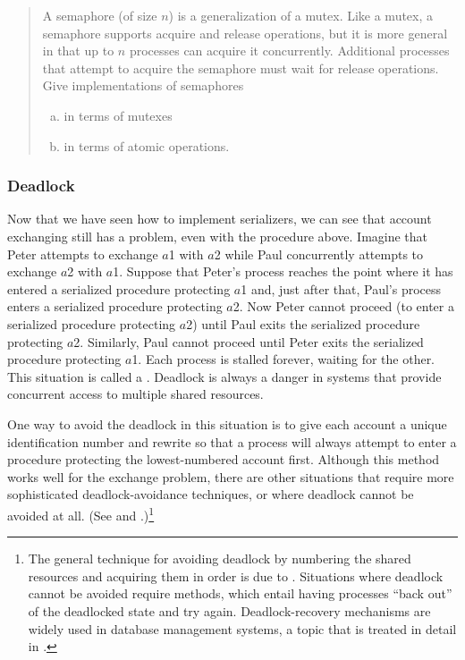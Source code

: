 \begin{quote}
 A semaphore (of size \( n \)) is a
generalization of a mutex.  Like a mutex, a semaphore supports acquire and
release operations, but it is more general in that up to \( n \) processes can
acquire it concurrently.  Additional processes that attempt to acquire the
semaphore must wait for release operations.  Give implementations of semaphores

\begin{enumerate}[a.]

\item
in terms of mutexes

\item
in terms of atomic  operations.

\end{enumerate}
\end{quote}

\subsubsection*{Deadlock}

Now that we have seen how to implement serializers, we can see that account
exchanging still has a problem, even with the 
procedure above.  Imagine that Peter attempts to exchange \( a \)1 with \( a \)2
while Paul concurrently attempts to exchange \( a \)2 with \( a \)1.  Suppose that
Peter's process reaches the point where it has entered a serialized procedure
protecting \( a \)1 and, just after that, Paul's process enters a serialized
procedure protecting \( a \)2.  Now Peter cannot proceed (to enter a serialized
procedure protecting \( a \)2) until Paul exits the serialized procedure
protecting \( a \)2.  Similarly, Paul cannot proceed until Peter exits the
serialized procedure protecting \( a \)1.  Each process is stalled forever,
waiting for the other.  This situation is called a .
Deadlock is always a danger in systems that provide concurrent access to
multiple shared resources.

One way to avoid the deadlock in this situation is to give each account a
unique identification number and rewrite  so that a
process will always attempt to enter a procedure protecting the lowest-numbered
account first.  Although this method works well for the exchange problem, there
are other situations that require more sophisticated deadlock-avoidance
techniques, or where deadlock cannot be avoided at all.  (See 
and .)\footnote{The general technique for avoiding
deadlock by numbering the shared resources and acquiring them in order is due
to .  Situations where deadlock cannot be avoided require
 methods, which entail having processes ``back out''
of the deadlocked state and try again.  Deadlock-recovery mechanisms are widely
used in database management systems, a topic that is treated in detail in
.}

